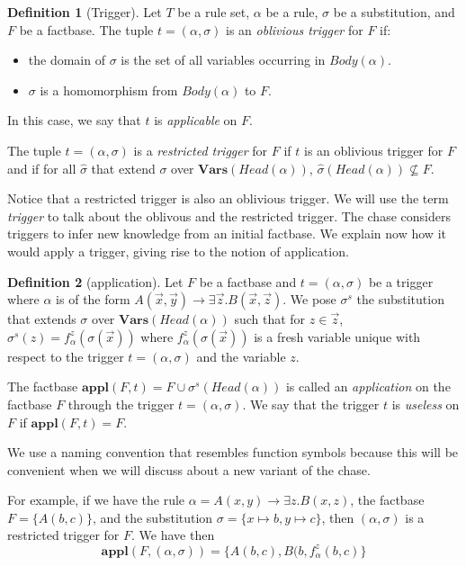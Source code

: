 \documentclass{article}
\theoremstyle{definition}
\newtheorem{definition}{Definition}[section]
\theoremstyle{remark}
\newcommand{\Vars}{\textbf{Vars}}
\newcommand{\Appl}{\textbf{appl}}
\begin{document}
\begin{definition}[Trigger]
Let $T$ be a rule set, $\alpha$ be a rule, $\sigma$ be a substitution, and $F$ be a factbase. The tuple $t = (\alpha,\sigma)$ is an \emph{oblivious trigger} for $F$ if: 
\begin{itemize}
\item the domain of $\sigma$ is the set of all variables occurring in $Body(\alpha)$.
\item $\sigma$ is a homomorphism from $Body(\alpha)$ to $F$.
\end{itemize}
In this case, we say that $t$ is \emph{applicable} on $F$.

The tuple $t = (\alpha,\sigma)$ is a \emph{restricted trigger} for $F$ if $t$ is an oblivious trigger for $F$ and if for all $\hat \sigma$ that extend $\sigma$ over $\Vars(\textit{Head}(\alpha))$, $\hat \sigma(Head(\alpha)) \nsubseteq F$.
\end{definition} 



Notice that a restricted trigger is also an oblivious trigger. We will use the term \emph{trigger} to talk about the oblivous and the restricted trigger. The chase considers triggers to infer new knowledge from an initial factbase. We explain now how it would apply a trigger, giving rise to the notion of application. 

\begin{definition}[application]
Let $F$ be a factbase and $t = (\alpha,\sigma)$ be a trigger where $\alpha$ is of the form $A(\vec x,\vec y) \rightarrow \exists \vec z. B(\vec x,\vec z)$. We pose \emph{$\sigma^s$} the substitution that extends $\sigma$ over $\Vars(\textit{Head}(\alpha))$ such that for $z \in \vec z$, $\sigma^s(z) = f^z_\alpha(\sigma(\vec x))$ where $f^z_\alpha(\sigma(\vec x))$ is a fresh variable unique with respect to the trigger $t = (\alpha,\sigma)$ and the variable $z$.

The factbase $\Appl(F,t)=F \cup \sigma^s(\textit{Head}(\alpha))$ is called an \emph{application} on the factbase $F$ through the trigger $t = (\alpha,\sigma)$. We say that the trigger $t$ is \emph{useless} on $F$ if $\Appl(F,t) = F$.
\end{definition}

We use a naming convention that resembles function symbols because this will be convenient when we will discuss about a new variant of the chase.

For example, if we have the rule $\alpha = A(x,y) \rightarrow \exists z.B(x,z)$, the factbase $F = \{A(b,c)\}$, and the substitution $\sigma = \{x \mapsto b, y \mapsto c \}$, then $(\alpha,\sigma)$ is a restricted trigger for $F$. We have then $$\Appl(F,(\alpha,\sigma)) = \{A(b,c),B(b,f_{\alpha}^z(b,c)\}$$
\end{document}
